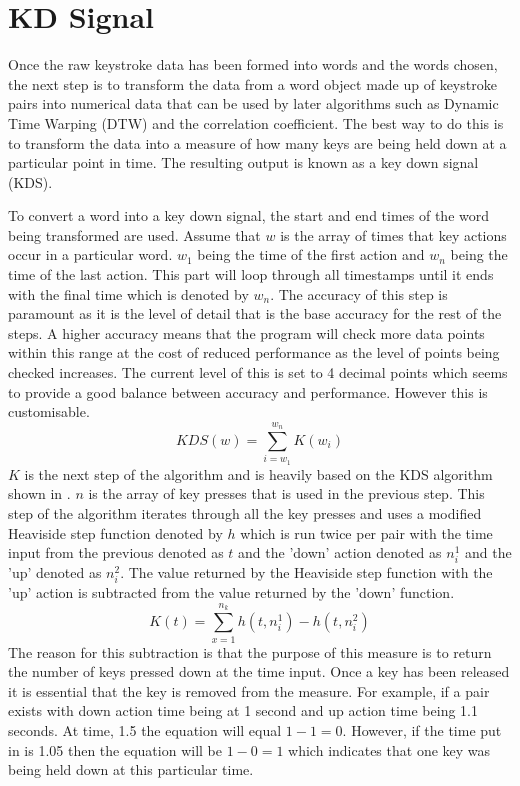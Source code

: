 \documentclass[10pt,a4paper]{report}
\begin{document}
\section{KD Signal}
Once the raw keystroke data has been formed into words and the words chosen, the next step is to transform the data from a word object made up of keystroke pairs into numerical data that can be used by later algorithms such as Dynamic Time Warping (DTW) and the correlation coefficient. The best way to do this is to transform the data into a measure of how many keys are being held down at a particular point in time. The resulting output is known as a key down signal (KDS). \cite{ToosiRamin2021Taok}

To convert a word into a key down signal, the start and end times of the word being transformed are used. Assume that \(w\) is the array of times that key actions occur in a particular word. \(w_1\) being the time of the first action and \(w_n\) being the time of the last action. This part will loop through all timestamps until it ends with the final time which is denoted by \(w_n\). The accuracy of this step is paramount as it is the level of detail that is the base accuracy for the rest of the steps. A higher accuracy means that the program will check more data points within this range at the cost of reduced performance as the level of points being checked increases. The current level of this is set to 4 decimal points which seems to provide a good balance between accuracy and performance. However this is customisable.
\begin{equation}
\textit{KDS}(w) = \sum^{w_n}_{i=w_1}K(w_i)
\end{equation}
\(K\) is the next step of the algorithm and is heavily based on the KDS algorithm shown in \cite{ToosiRamin2021Taok}. \(n\) is the array of key presses that is used in the previous step. This step of the algorithm iterates through all the key presses and uses a modified Heaviside step function denoted by \(h\) which is run twice per pair with the time input from the previous denoted as \(t\) and the 'down' action denoted as \(n_i^1\) and the 'up' denoted as \(n_i^2\). The value returned by the Heaviside step function with the 'up' action is subtracted from the value returned by the 'down' function.
\begin{equation}
\textit{K}(t) = \sum^{n_k}_{x=1}h(t,n_i^1)-h(t,n_i^2)
\end{equation}
The reason for this subtraction is that the purpose of this measure is to return the number of keys pressed down at the time input. Once a key has been released it is essential that the key is removed from the measure. For example, if a pair exists with down action time being at 1 second and up action time being 1.1 seconds. At time, 1.5 the equation will equal \(1-1=0\). However, if the time put in is 1.05 then the equation will be \(1-0=1\) which indicates that one key was being held down at this particular time.
\end{document}
